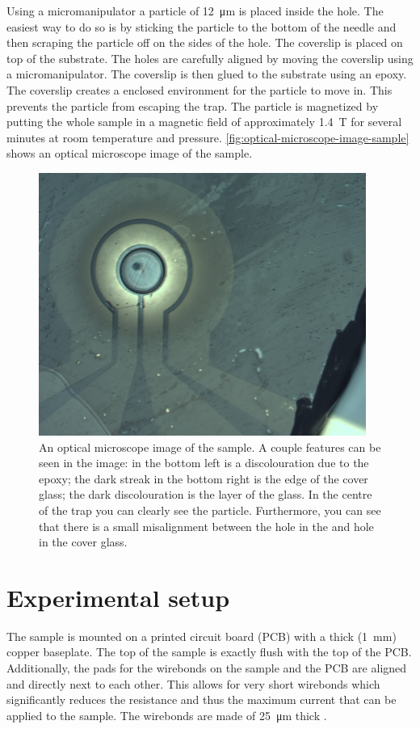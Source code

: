 Using a micromanipulator a  particle of \qty{12}{\um} is placed inside the  hole. The easiest way to do so is by sticking the particle to the bottom of the needle and then scraping the particle off on the sides of the  hole. The coverslip is placed on top of the  substrate. The holes are carefully aligned by moving the coverslip using a micromanipulator. The coverslip is then glued to the  substrate using an epoxy. The coverslip creates a enclosed environment for the particle to move in. This prevents the particle from escaping the trap. The particle is magnetized by putting the whole sample in a magnetic field of approximately \qty{1.4}{\tesla} for several minutes at room temperature and pressure. \autoref{fig:optical-microscope-image-sample} shows an optical microscope image of the sample.

\begin{figure}
    \centering
    \includegraphics{figures/sample/trap_optical_microscope.pdf}
    \caption{An optical microscope image of the sample. A couple features can be seen in the image: in the bottom left is a discolouration due to the epoxy; the dark streak in the bottom right is the edge of the cover glass; the dark discolouration is the  layer of the glass. In the centre of the trap you can clearly see the  particle. Furthermore, you can see that there is a small misalignment between the hole in the  and hole in the cover glass.}
    \label{fig:optical-microscope-image-sample}
\end{figure}

\section{Experimental setup}
The sample is mounted on a printed circuit board (PCB) with a thick (\qty{1}{\mm}) copper baseplate. The top of the sample is exactly flush with the top of the PCB. Additionally, the pads for the wirebonds on the sample and the PCB are aligned and directly next to each other. This allows for very short wirebonds which significantly reduces the resistance and thus the maximum current that can be applied to the sample. The wirebonds are made of \qty{25}{\um} thick .

